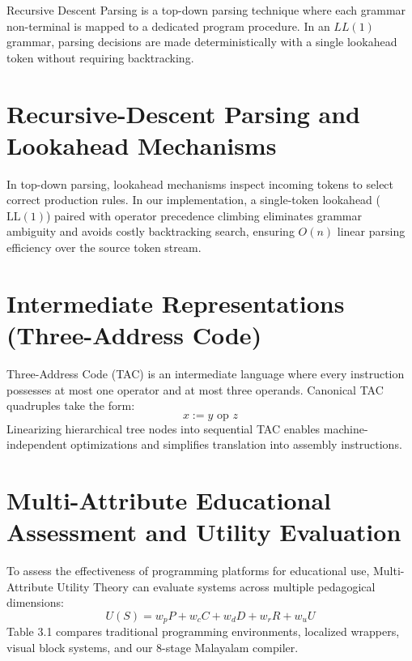 \documentclass[12pt,a4paper]{report}
\begin{document}
Recursive Descent Parsing is a top-down parsing technique where each grammar non-terminal is mapped to a dedicated program procedure. In an $LL(1)$ grammar, parsing decisions are made deterministically with a single lookahead token without requiring backtracking.

\section{Recursive-Descent Parsing and Lookahead Mechanisms}
In top-down parsing, lookahead mechanisms inspect incoming tokens to select correct production rules. In our implementation, a single-token lookahead ($\text{LL}(1)$) paired with operator precedence climbing eliminates grammar ambiguity and avoids costly backtracking search, ensuring $O(n)$ linear parsing efficiency over the source token stream.

\section{Intermediate Representations (Three-Address Code)}
Three-Address Code (TAC) is an intermediate language where every instruction possesses at most one operator and at most three operands. Canonical TAC quadruples take the form:
\begin{equation}
    x := y \text{ op } z
\end{equation}
Linearizing hierarchical tree nodes into sequential TAC enables machine-independent optimizations and simplifies translation into assembly instructions.

\section{Multi-Attribute Educational Assessment and Utility Evaluation}
To assess the effectiveness of programming platforms for educational use, Multi-Attribute Utility Theory can evaluate systems across multiple pedagogical dimensions:
\begin{equation}
    U(S) = w_p P + w_c C + w_d D + w_r R + w_u U
\end{equation}
Table 3.1 compares traditional programming environments, localized wrappers, visual block systems, and our 8-stage Malayalam compiler.
\end{document}
